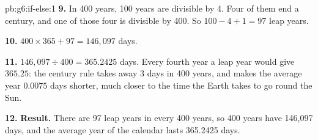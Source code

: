 \begin{solution}{pb:g6:if-else:1}
\textbf{9.} In 400 years, 100 years are divisible by 4. Four of them end a
century, and one of those four is divisible by 400. So $100 - 4 + 1 = 97$ leap
years.

\textbf{10.} $400 \times 365 + 97 = 146{,}097$ days.

\textbf{11.} $146{,}097 \div 400 = 365.2425$ days. Every fourth year a leap year
would give $365.25$: the century rule takes away 3 days in 400 years, and makes
the average year $0.0075$ days shorter, much closer to the time the Earth takes
to go round the Sun.

\textbf{12.} \textbf{Result.} There are 97 leap years in every 400 years, so
400 years have 146,097 days, and the average year of the calendar lasts 365.2425
days.
\end{solution}
